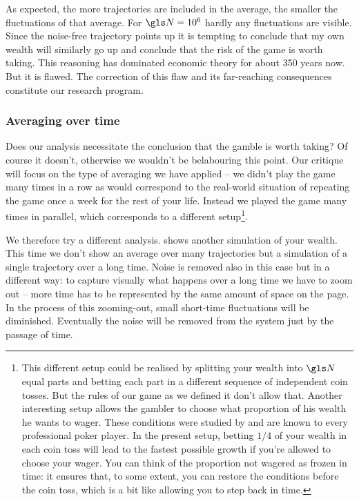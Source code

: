 \FloatBarrier
As expected, the more 
trajectories are included in the average, the smaller the fluctuations of 
that average. For $\N=10^6$ hardly any fluctuations are visible. Since the 
noise-free trajectory points up it is tempting to conclude that my own wealth will similarly go up and  conclude that the risk 
of the game is worth taking. This reasoning has dominated economic 
theory for about 350 years now. But it is flawed. The correction of this flaw and its far-reaching consequences constitute our research program.

\subsubsection{Averaging over time}
Does our analysis necessitate the conclusion that the gamble is worth taking? 
Of course it doesn't, otherwise we wouldn't be belabouring this point. 
 Our critique will focus on the type of averaging we have applied -- we didn't play the game many times
in a row as would correspond to the real-world situation of repeating the game once a week for the rest of your life. 
Instead we played the game many times in parallel, which corresponds to a different setup\footnote{This different setup could be realised by splitting your wealth into $\N$ equal parts and betting each part in a different sequence of independent coin tosses. But the rules of our game as we defined it don't allow that. Another interesting setup allows the gambler to choose what proportion of his wealth he wants to wager. These conditions were studied by  \cite{Kelly1956} and are known to every professional poker player. In the present setup, betting $1/4$ of your wealth in each coin toss will lead to the fastest possible growth if you're allowed to choose your wager. You can think of the proportion not wagered as frozen in time: it ensures that, to some extent, you can restore the conditions before the coin toss, which is a bit like allowing you to step back in time.}.

We therefore try a different analysis.  shows another simulation of your wealth. This time we don't show an average over many trajectories but a simulation of a single trajectory
over a long time. Noise is removed also in this case but in a different way: to capture visually what 
happens over a long time we have to zoom out -- more time has to be represented by 
the same amount of space on the page. In the process of this zooming-out, small 
short-time fluctuations will be diminished. Eventually the noise will be removed from the system 
just by the passage of time.

